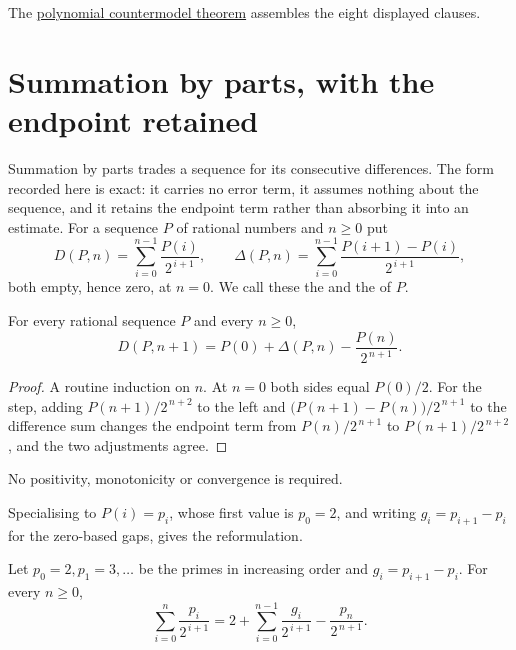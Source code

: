 \documentclass[11pt]{article}
\begin{document}
\noindent The \href{https://github.com/wcook04/plectis-erdos/blob/f36a98bf3d3e6f65f1074e3b800e3293d5b8a51a/ErdosProblems/Erdos251/PaperCoreR7.lean#L27}{polynomial countermodel theorem}
assembles the eight displayed clauses.

\section{Summation by parts, with the endpoint retained}\label{sec:parts}

Summation by parts trades a sequence for its consecutive differences.  The form
recorded here is exact: it carries no error term, it assumes nothing about the
sequence, and it retains the endpoint term rather than absorbing it into an
estimate.  For a sequence $P$ of rational numbers and $n\ge0$ put
\[
 D(P,n)=\sum_{i=0}^{n-1}\frac{P(i)}{2^{\,i+1}},
 \qquad
 \Delta(P,n)=\sum_{i=0}^{n-1}\frac{P(i+1)-P(i)}{2^{\,i+1}} ,
\]
both empty, hence zero, at $n=0$.  We call these the
 and the
 of $P$.

\begin{proposition}\label{res:abel}
For every rational sequence $P$ and every $n\ge0$,
\[
 D(P,n+1)=P(0)+\Delta(P,n)-\frac{P(n)}{2^{\,n+1}} .
\]
\end{proposition}

\begin{proof}
A routine induction on $n$.  At $n=0$ both sides equal $P(0)/2$.  For the step, adding
$P(n+1)/2^{\,n+2}$ to the left and
$\bigl(P(n+1)-P(n)\bigr)/2^{\,n+1}$ to the difference sum changes the endpoint
term from $P(n)/2^{\,n+1}$ to $P(n+1)/2^{\,n+2}$, and the two adjustments agree.
\end{proof}

No positivity, monotonicity or convergence is required.

Specialising to $P(i)=p_i$, whose first value is $p_0=2$, and writing
$g_i=p_{i+1}-p_i$ for the zero-based gaps, gives the reformulation.

\begin{theorem}\label{res:parts}
Let $p_0=2,p_1=3,\ldots$ be the primes in increasing order and
$g_i=p_{i+1}-p_i$.  For every $n\ge0$,
\[
 \sum_{i=0}^{n}\frac{p_i}{2^{\,i+1}}
 =2+\sum_{i=0}^{n-1}\frac{g_i}{2^{\,i+1}}-\frac{p_n}{2^{\,n+1}} .
\]
\end{theorem}
\end{document}
